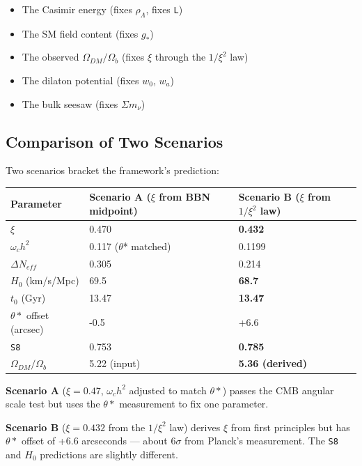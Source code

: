\documentclass[aps,prd,preprint,superscriptaddress,longbibliography]{revtex4-2}
\begin{document}
\begin{itemize}
  \item The Casimir energy (fixes $\rho_\Lambda$, fixes \texttt{L})
  \item The SM field content (fixes $g_*$)
  \item The observed $\Omega_{DM}/\Omega_b$ (fixes $\xi$ through the $1/\xi^{2}$ law)
  \item The dilaton potential (fixes $w_{0}$, $w_a$)
  \item The bulk seesaw (fixes $\Sigma m_\nu$)
\end{itemize}



\subsection{Comparison of Two Scenarios}

Two scenarios bracket the framework's prediction:


\begin{table}[H]
\begin{ruledtabular}
\begin{tabular}{p{5.0cm}p{5.0cm}p{5.0cm}}
Parameter & Scenario A ($\xi$ from BBN midpoint) & Scenario B ($\xi$ from $1/\xi^{2}$ law) \\
\hline
$\xi$ & 0.470 & \textbf{0.432} \\
$\omega_c h^{2}$ & 0.117 ($\theta$* matched) & 0.1199 \\
$\Delta N_{eff}$ & 0.305 & 0.214 \\
$H_{0}$ (km/s/Mpc) & 69.5 & \textbf{68.7} \\
$t_{0}$ (Gyr) & 13.47 & \textbf{13.47} \\
$\theta*$ offset (arcsec) & -0.5 & +6.6 \\
\texttt{S8} & 0.753 & \textbf{0.785} \\
$\Omega_{DM}/\Omega_b$ & 5.22 (input) & \textbf{5.36 (derived)} \\
\end{tabular}
\end{ruledtabular}
\end{table}

\textbf{Scenario A} ($\xi = 0.47$, $\omega_c h^{2}$ adjusted to match $\theta*$) passes the CMB angular scale test but uses the $\theta*$ measurement to fix one parameter.

\textbf{Scenario B} ($\xi = 0.432$ from the $1/\xi^{2}$ law) derives $\xi$ from first principles but has $\theta*$ offset of +6.6 arcseconds --- about $6\sigma$ from Planck's measurement. The \texttt{S8} and $H_{0}$ predictions are slightly different.
\end{document}
